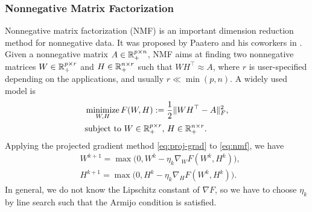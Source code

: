 \subsubsection{Nonnegative Matrix Factorization}
Nonnegative matrix factorization (NMF) is an important dimension reduction method for nonnegative data. It was proposed by Paatero and his coworkers in \cite{paatero1994NMF}. Given a nonnegative matrix $A\in\mathbb{R}^{p\times n}_+$, NMF aims at finding two nonnegative matrices $W\in\mathbb{R}^{p\times r}_+$ and $H\in\mathbb{R}^{n\times r}_+$ such that $WH^\top\approx A$, where $r$ is user-specified depending on the applications, and usually $r\ll \min(p,n)$. A widely used model is
\begin{equation}\label{eq:nmf}
\begin{aligned}
&\Min_{W,H}F(W,H):=\frac{1}{2}\|WH^\top-A\|_F^2, \\
& \St\ W\in\RR^{p\times r}_+,\, H\in \RR^{n\times r}_+. 
\end{aligned}
\end{equation}
Applying the projected gradient method \eqref{eq:proj-grad} to \eqref{eq:nmf}, we have
\begin{subequations}\label{pg-nmf}
\begin{align}
&W^{k+1}=\max\big(0, W^k-\eta_k \nabla_W F(W^k, H^k)\big),\\
&H^{k+1}=\max\big(0,H^k-\eta_k \nabla_H F(W^k, H^k) \big).
\end{align}
\end{subequations}
In general, we do not know the Lipschitz constant of $\nabla F$, so we have to choose $\eta_k$ by line search such that the Armijo condition is satisfied.

